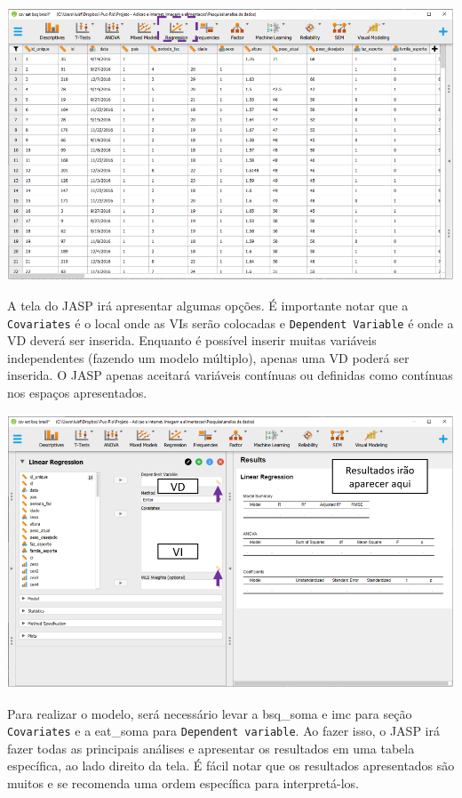 \documentclass[
]{book}
\begin{document}
\includegraphics{./img/cap_reg_multipla_interface.png}

A tela do JASP irá apresentar algumas opções. É importante notar que a \texttt{Covariates} é o local onde as VIs serão colocadas e \texttt{Dependent\ Variable} é onde a VD deverá ser inserida. Enquanto é possível inserir muitas variáveis independentes (fazendo um modelo múltiplo), apenas uma VD poderá ser inserida. O JASP apenas aceitará variáveis contínuas ou definidas como contínuas nos espaços apresentados.

\includegraphics{./img/cap_reg_interface.png}

Para realizar o modelo, será necessário levar a bsq\_soma e imc para seção \texttt{Covariates} e a eat\_soma para \texttt{Dependent\ variable}. Ao fazer isso, o JASP irá fazer todas as principais análises e apresentar os resultados em uma tabela específica, ao lado direito da tela. É fácil notar que os resultados apresentados são muitos e se recomenda uma ordem específica para interpretá-los.
\end{document}
